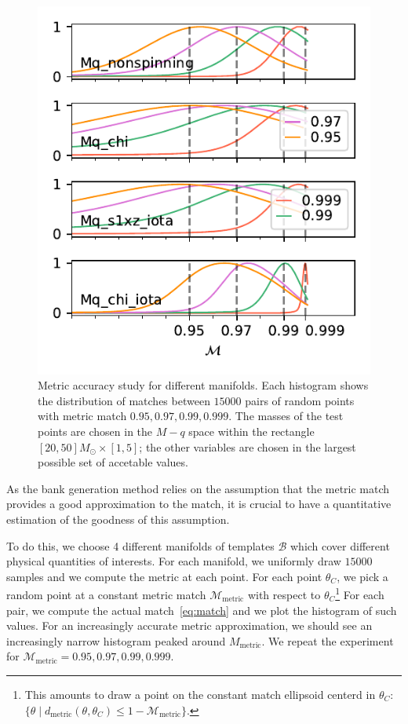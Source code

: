 \documentclass[twocolumn,showpacs,preprintnumbers,nofootinbib,prd,
superscriptaddress,10pt]{revtex4-2}
\begin{document}
\begin{figure}[t]
	\centering
	\includegraphics{metric_accuracy_hessian}
	\caption{Metric accuracy study for different manifolds.
	Each histogram shows the distribution of matches between $15000$ pairs of random points with metric match $0.95, 0.97, 0.99, 0.999$. The masses of the test points are chosen in the $M-q$ space within the rectangle ${[20, 50] M_\odot \times [1,5]}$; the other variables are chosen in the largest possible set of accetable values.}
	\label{fig:metric_accuracy}
\end{figure}

As the bank generation method relies on the assumption that the metric match provides a good approximation to the match, it is crucial to have a quantitative estimation of the goodness of this assumption.

To do this, we choose 4 different manifolds of templates $\mathcal{B}$ which cover different physical quantities of interests. For each manifold, we uniformly draw $15000$ samples and we compute the metric at each point.
For each point $\theta_C$, we pick a random point at a constant metric match $\mathcal{M}_{\text{metric}}$ with respect to $\theta_C$\footnote{
This amounts to draw a point on the constant match ellipsoid centerd in
$\theta_C$: $\{\theta \; | \; d_{\text{metric}}(\theta,\theta_C) \leq 1-\mathcal{M}_{\text{metric}} \}$.
}
For each pair, we compute the actual match~\eqref{eq:match} and we plot the histogram of such values. For an increasingly accurate metric approximation, we should see an increasingly narrow histogram peaked around $M_{\text{metric}}$.
We repeat the experiment for $\mathcal{M}_{\text{metric}} = 0.95, 0.97, 0.99, 0.999$.
\end{document}
